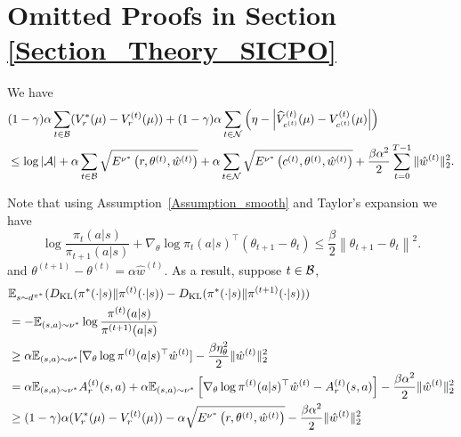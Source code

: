 \section{Omitted Proofs in Section \ref{Section_Theory_SICPO}}
\label{Appendix_Proofs_SICPO}

\begin{lemma}\label{Lemma_basic_expansion}
We have
$$
\begin{aligned}
&(1-\gamma)\alpha\sum_{t\in {\mathcal{B}}} (V_r^*(\mu)-V_r^{(t)}(\mu))+(1-\gamma)\alpha\sum_{t\in{\mathcal{N}}}\left(\eta-\left|\widehat V_{c^{(t)}}^{(t)}(\mu)-V_{c^{(t)}}^{(t)}(\mu)\right|\right)\\
&\leq \log|{\mathcal{A}}|+\alpha\sum_{t\in{\mathcal{B}}}\sqrt{E^{\nu^*}\left(r, \theta^{(t)},\hat w^{(t)}\right)}+\alpha\sum_{t\in{\mathcal{N}}}\sqrt{E^{\nu^*}\left(c^{(t)}, \theta^{(t)},\hat w^{(t)}\right)}+\frac{\beta\alpha^2}{2}\sum_{t=0}^{T-1}\|\hat w^{(t)}\|_2^2.
\end{aligned}
$$
\end{lemma}
Note that using Assumption~\ref{Assumption_smooth} and Taylor's expansion we have
$$
\log \frac{\pi_t(a | s)}{\pi_{t+1}(a | s)}+\nabla_{\theta} \log \pi_{t}(a | s)^\top\left(\theta_{t+1}-\theta_t\right) \leq \frac{\beta}{2}\left\|\theta_{t+1}-\theta_t\right\|^{2}.
$$
and $\theta^{(t+1)}-\theta^{(t)}=\alpha\hat w^{(t)}$.
As a result, suppose $t\in{\mathcal{B}}$,
$$
\begin{aligned}
&{\mathbb E}_{s\sim d^{\pi^*}}(D_{\operatorname{KL}}(\pi^*(\cdot|s)\|\pi^{(t)}(\cdot|s))-D_{\operatorname{KL}}(\pi^*(\cdot|s)\|\pi^{(t+1)}(\cdot|s)))\\
&=-{\mathbb E}_{(s,a)\sim\nu^*}\log\frac{\pi^{(t)}(a|s)}{\pi^{(t+1)}(a|s)}\\
&\geq\alpha{\mathbb E}_{(s,a)\sim\nu^*}[\nabla_{\theta} \log \pi^{(t)}(a | s)^\top \hat w^{(t)}]-\frac{\beta\eta_\theta^2}{2}\|\hat w^{(t)}\|^2_2\\
&=\alpha{\mathbb E}_{(s,a)\sim\nu^*} A_r^{(t)}(s,a)+\alpha {\mathbb E}_{(s,a)\sim\nu^*}\left[\nabla_\theta\log \pi^{(t)}(a|s)^\top \hat w^{(t)}-A_r^{(t)}(s,a)\right]-\frac{\beta\alpha^2}{2}\|\hat w^{(t)}\|^2_2\\
&\geq (1-\gamma)\alpha(V_r^*(\mu)-V_r^{(t)}(\mu))-\alpha\sqrt{E^{\nu^*}\left(r, \theta^{(t)},\hat w^{(t)}\right)}
-\frac{\beta\alpha^2}{2}\|\hat w^{(t)}\|^2_2\\
\end{aligned}
$$

